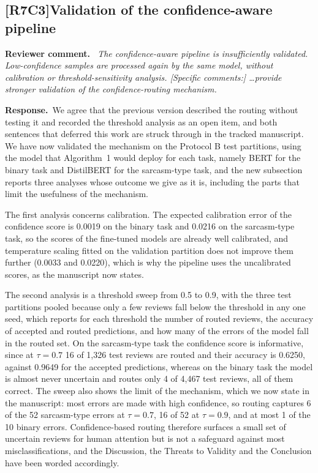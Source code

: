 \documentclass[11pt,a4paper]{article}
\newcommand{\comment}[3]{\subsection*{\textcolor{#1}{[#2]}\enspace #3}}
\newenvironment{reviewercomment}{\par\noindent\textbf{Reviewer comment.}\itshape\ }{\par}
\newcommand{\response}{\par\noindent\textbf{Response.}\ }
\begin{document}
\comment{rvSeven}{R7C3}{Validation of the confidence-aware pipeline}
\begin{reviewercomment}
The confidence-aware pipeline is insufficiently validated. Low-confidence samples are processed again by the same model, without calibration or threshold-sensitivity analysis. [Specific comments:] \ldots provide stronger validation of the confidence-routing mechanism.
\end{reviewercomment}
\response We agree that the previous version described the routing without testing it and recorded the threshold analysis as an open item, and both sentences that deferred this work are struck through in the tracked manuscript. We have now validated the mechanism on the Protocol B test partitions, using the model that Algorithm~1 would deploy for each task, namely BERT for the binary task and DistilBERT for the sarcasm-type task, and the new subsection reports three analyses whose outcome we give as it is, including the parts that limit the usefulness of the mechanism.

The first analysis concerns calibration. The expected calibration error of the confidence score is 0.0019 on the binary task and 0.0216 on the sarcasm-type task, so the scores of the fine-tuned models are already well calibrated, and temperature scaling fitted on the validation partition does not improve them further (0.0033 and 0.0220), which is why the pipeline uses the uncalibrated scores, as the manuscript now states.

The second analysis is a threshold sweep from 0.5 to 0.9, with the three test partitions pooled because only a few reviews fall below the threshold in any one seed, which reports for each threshold the number of routed reviews, the accuracy of accepted and routed predictions, and how many of the errors of the model fall in the routed set. On the sarcasm-type task the confidence score is informative, since at $\tau = 0.7$ 16 of 1,326 test reviews are routed and their accuracy is 0.6250, against 0.9649 for the accepted predictions, whereas on the binary task the model is almost never uncertain and routes only 4 of 4,467 test reviews, all of them correct. The sweep also shows the limit of the mechanism, which we now state in the manuscript: most errors are made with high confidence, so routing captures 6 of the 52 sarcasm-type errors at $\tau = 0.7$, 16 of 52 at $\tau = 0.9$, and at most 1 of the 10 binary errors. Confidence-based routing therefore surfaces a small set of uncertain reviews for human attention but is not a safeguard against most misclassifications, and the Discussion, the Threats to Validity and the Conclusion have been worded accordingly.
\end{document}
